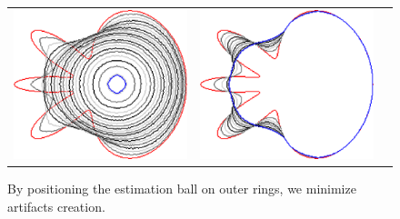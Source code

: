 \begin{figure}
\begin{tabular}{ccc}
\includegraphics[scale=0.22]{figures/chapter6/level-effect/flower/improve/len_pen0/radius-9/level6/summary.pdf} &
\includegraphics[scale=0.22]{figures/chapter6/level-effect/flower/improve/len_pen0/radius-9/level9/summary.pdf}
\end{tabular}
\caption{ By positioning the estimation ball on outer rings, we minimize artifacts creation. %
}
\label{ch6:fig:mrings-r9-evolution}
\end{figure}




